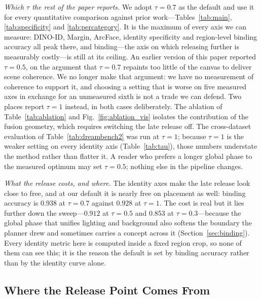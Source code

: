 \documentclass[10pt,twocolumn,letterpaper]{article}
\begin{document}
\noindent\textit{Which $\tau$ the rest of the paper reports.}
We adopt $\tau{=}0.7$ as the default and use it for every quantitative
comparison against prior work---Tables~\ref{tab:main},
\ref{tab:specificity} and \ref{tab:percategory}.  It is the maximum of every
axis we can measure: DINO-ID, Margin, ArcFace, identity specificity and
region-level binding accuracy all peak there, and binding---the axis on which
releasing further is measurably costly---is still at its ceiling.
An earlier version of this paper reported $\tau{=}0.5$, on the argument that
$\tau{=}0.7$ repaints too little of the canvas to deliver scene coherence.  We
no longer make that argument: we have no measurement of coherence to support
it, and choosing a setting that is worse on five measured axes in exchange for
an unmeasured sixth is not a trade we can defend.
Two places report $\tau{=}1$ instead, in both cases deliberately.  The ablation of
Table~\ref{tab:ablation} and Fig.~\ref{fig:ablation_vis} isolates the
contribution of the fusion geometry, which requires switching the late
release off.  The cross-dataset evaluation of
Table~\ref{tab:dreambench2} was run at $\tau{=}1$; because $\tau{=}1$ is
the weaker setting on every identity axis (Table~\ref{tab:tau}), those
numbers understate the method rather than flatter it.  A reader who prefers
a longer global phase to the measured optimum may set $\tau{=}0.5$; nothing
else in the pipeline changes.

\noindent\textit{What the release costs, and where.}
The identity axes make the late release look close to free, and at our default
it is nearly free on placement as well: binding accuracy is $0.938$ at $\tau{=}0.7$
against $0.928$ at $\tau{=}1$.  The cost is real but it lies further down the
sweep---$0.912$ at $\tau{=}0.5$ and $0.853$
at $\tau{=}0.3$---because the global phase that unifies lighting and
background also softens the boundary the planner drew and sometimes carries a
concept across it (Section~\ref{sec:binding}).  Every identity metric here is
computed inside a fixed region crop, so none of them can see this; it is the
reason the default is set by binding accuracy rather than by the identity
curve alone.

\subsection{Where the Release Point Comes From}
\label{sec:commitment}
\end{document}
